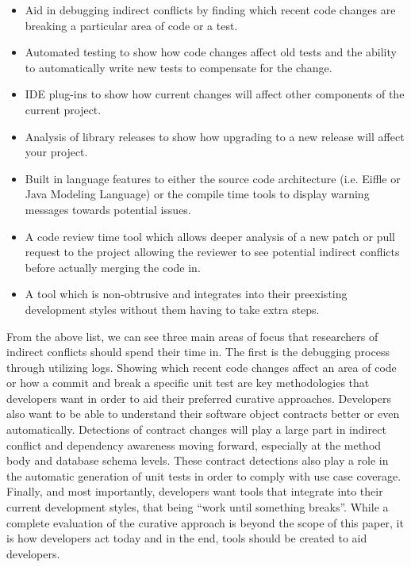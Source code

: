 \documentclass[conference]{IEEEtran}
\begin{document}
\begin{itemize}
	\item Aid in debugging indirect conflicts by finding which recent code changes are breaking a particular area of code or a test.
	\item Automated testing to show how code changes affect old tests and the ability to automatically write new tests to compensate for the change.
	\item IDE plug-ins to show how current changes will affect other components of the current project.
	\item Analysis of library releases to show how upgrading to a new release will affect your project.
	\item Built in language features to either the source code architecture (i.e. Eiffle or Java Modeling Language) or the compile time tools to display
				warning messages towards potential issues.
	\item A code review time tool which allows deeper analysis of a new patch or pull request to the project allowing the reviewer to see potential 
				indirect conflicts before actually merging the code in.
	\item A tool which is non-obtrusive and integrates into their preexisting development styles without them having to take extra steps.
\end{itemize}

From the above list, we can see three main areas of focus that researchers of indirect conflicts should spend their time in. The first
is the debugging process through utilizing logs. Showing which recent code changes affect an area of code or how a commit and break a specific
unit test are key methodologies that developers want in order to aid their preferred curative approaches. Developers also want to be able to
understand their software object contracts better or even automatically. Detections of contract changes will play a large part in indirect conflict
and dependency awareness moving forward, especially at the method body and database schema levels. These contract detections also play a role in
the automatic generation of unit tests in order to comply with use case coverage. Finally, and most importantly, developers want tools that
integrate into their current development styles, that being ``work until something breaks''. While a complete evaluation of the curative approach
is beyond the scope of this paper, it is how developers act today and  in the end, tools should be created to aid developers.
\end{document}
